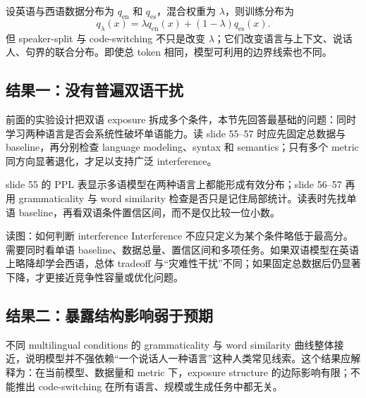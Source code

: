 
设英语与西语数据分布为 $q_{\mathrm{en}}$ 和 $q_{\mathrm{es}}$，混合权重为 $\lambda$，则训练分布为
\[
q_{\lambda}(x)=\lambda q_{\mathrm{en}}(x)+(1-\lambda)q_{\mathrm{es}}(x).
\]
但 speaker-split 与 code-switching 不只是改变 $\lambda$；它们改变语言与上下文、说话人、句界的联合分布。即使总 token 相同，模型可利用的边界线索也不同。

\subsection{结果一：没有普遍双语干扰}

前面的实验设计把双语 exposure 拆成多个条件，本节先回答最基础的问题：同时学习两种语言是否会系统性破坏单语能力。读 slide 55--57 时应先固定总数据与 baseline，再分别检查 language modeling、syntax 和 semantics；只有多个 metric 同方向显著退化，才足以支持广泛 interference。

slide 55 的 PPL 表显示多语模型在两种语言上都能形成有效分布；slide 56--57 再用 grammaticality 与 word similarity 检查是否只是记住局部统计。读表时先找单语 baseline，再看双语条件置信区间，而不是仅比较一位小数。




\begin{knowledgebox}{读图：如何判断 interference}
Interference 不应只定义为某个条件略低于最高分。需要同时看单语 baseline、数据总量、置信区间和多项任务。如果双语模型在英语上略降却学会西语，总体 tradeoff 与“灾难性干扰”不同；如果固定总数据后仍显著下降，才更接近竞争性容量或优化问题。
\end{knowledgebox}

\subsection{结果二：暴露结构影响弱于预期}

不同 multilingual conditions 的 grammaticality 与 word similarity 曲线整体接近，说明模型并不强依赖“一个说话人一种语言”这种人类常见线索。这个结果应解释为：在当前模型、数据量和 metric 下，exposure structure 的边际影响有限；不能推出 code-switching 在所有语言、规模或生成任务中都无关。

